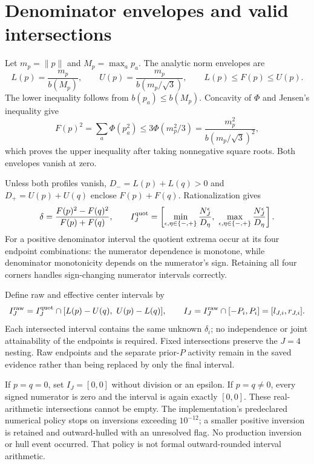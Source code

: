 \documentclass[11pt,a4paper]{article}
\begin{document}
\clearpage
\section{Denominator envelopes and valid intersections}\label{sec:denominator}
Let $m_p=\|p\|$ and $M_p=\max_a p_a$. The analytic norm envelopes are
\begin{equation}\label{eq:envelopes}
L(p)=\frac{m_p}{b(M_p)},\qquad U(p)=\frac{m_p}{b(m_p/\sqrt3)},\qquad
L(p)\le F(p)\le U(p).
\end{equation}
The lower inequality follows from $b(p_a)\le b(M_p)$. Concavity of $\Phi$ and Jensen's inequality give
\[
F(p)^2=\sum_a\Phi(p_a^2)\le3\Phi(m_p^2/3)=\frac{m_p^2}{b(m_p/\sqrt3)^2},
\]
which proves the upper inequality after taking nonnegative square roots. Both envelopes vanish at zero.

Unless both profiles vanish, $D_-=L(p)+L(q)>0$ and $D_+=U(p)+U(q)$ enclose $F(p)+F(q)$. Rationalization gives
\begin{equation}\label{eq:quotient}
\delta=\frac{F(p)^2-F(q)^2}{F(p)+F(q)},\qquad
I_J^{\rm quot}=\left[\min_{\epsilon,\eta\in\{-,+\}}\frac{N_J^\epsilon}{D_\eta},\
\max_{\epsilon,\eta\in\{-,+\}}\frac{N_J^\epsilon}{D_\eta}\right].
\end{equation}
For a positive denominator interval the quotient extrema occur at its four endpoint combinations: the numerator dependence is monotone, while denominator monotonicity depends on the numerator's sign. Retaining all four corners handles sign-changing numerator intervals correctly.

Define raw and effective center intervals by
\begin{equation}\label{eq:intersections}
I_J^{\rm raw}=I_J^{\rm quot}\cap[L(p)-U(q),\ U(p)-L(q)],\qquad
I_J=I_J^{\rm raw}\cap[-P_i,P_i]=[l_{J,i},r_{J,i}].
\end{equation}
Each intersected interval contains the same unknown $\delta_i$; no independence or joint attainability of the endpoints is required. Fixed intersections preserve the $J=4$ nesting. Raw endpoints and the separate prior-$P$ activity remain in the saved evidence rather than being replaced by only the final interval.

If $p=q=0$, set $I_J=[0,0]$ without division or an epsilon. If $p=q\ne0$, every signed numerator is zero and the interval is again exactly $[0,0]$. These real-arithmetic intersections cannot be empty. The implementation's predeclared numerical policy stops on inversions exceeding $10^{-12}$; a smaller positive inversion is retained and outward-hulled with an unresolved flag. No production inversion or hull event occurred. That policy is not formal outward-rounded interval arithmetic.
\end{document}
